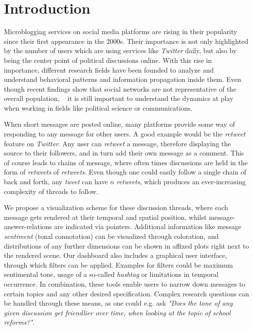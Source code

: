 \chapter{Introduction}

Microblogging services on social media platforms are rising in their popularity since their first appearance in the 2000s. Their importance is not only highlighted by the number of users which are using services like \emph{Twitter} daily, but also by being the center point of political discussions online. With this rise in importance, different research fields have been founded to analyze and understand behavioral patterns and information propagation inside them. Even though recent findings show that social networks are not representative of the overall population, ~\cite{mellon2017twitter} it is still important to understand the dynamics at play when working in fields like political science or communications. 

When short messages are posted online, many platforms provide some way of responding to any message for other users. A good example would be the \emph{retweet} feature on \emph{Twitter}. Any user can \emph{retweet} a message, therefore displaying the source to their followers, and in turn add their own message as a comment. This of course leads to chains of message, where often times discussions are held in the form of \emph{retweets} of \emph{retweets}. Even though one could easily follow a single chain of back and forth, any \emph{tweet} can have $n$ \emph{retweets}, which produces an ever-increasing complexity of threads to follow. 

We propose a visualization scheme for these discussion threads, where each message gets rendered at their temporal and spatial position, whilst message-answer-relations are indicated via pointers. Additional information like message \emph{sentiment} (tonal connotation) can be visualized through coloration, and distributions of any further dimensions can be shown in affixed plots right next to the rendered scene. Our dashboard also includes a graphical user interface, through which filters can be applied. Examples for filters could be maximum sentimental tone, usage of a so-called \emph{hashtag} or limitations in temporal occurrence. In combination, these tools enable users to narrow down messages to certain topics and any other desired specification. Complex research questions can be handled through these means, as one could e.g. ask \emph{"Does the tone of any given discussion get friendlier over time, when looking at the topic of school reforms?"}.